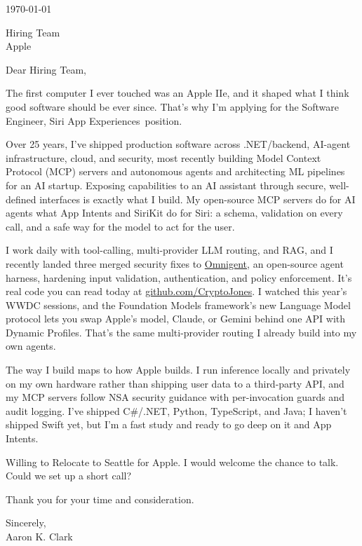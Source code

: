 \documentclass{resume}
\def\company{Apple}
\def\role{Software Engineer, Siri App Experiences}
\def\manager{Hiring Team}          %
\begin{document}
\vspace{0.5em}
\today

\bigskip
\noindent \manager \\
\company

\bigskip
\noindent Dear \manager,

The first computer I ever touched was an Apple IIe, and it shaped what I think good software should be ever since. That's why I'm applying for the \role\ position.

Over 25 years, I've shipped production software across .NET/backend, AI-agent infrastructure, cloud, and security, most recently building Model Context Protocol (MCP) servers and autonomous agents and architecting ML pipelines for an AI startup. Exposing capabilities to an AI assistant through secure, well-defined interfaces is exactly what I build. My open-source MCP servers do for AI agents what App Intents and SiriKit do for Siri: a schema, validation on every call, and a safe way for the model to act for the user.

I work daily with tool-calling, multi-provider LLM routing, and RAG, and I recently landed three merged security fixes to \href{https://github.com/omnigent-ai/omnigent}{Omnigent}, an open-source agent harness, hardening input validation, authentication, and policy enforcement. It's real code you can read today at \href{https://github.com/CryptoJones}{github.com/CryptoJones}. I watched this year's WWDC sessions, and the Foundation Models framework's new Language Model protocol lets you swap Apple's model, Claude, or Gemini behind one API with Dynamic Profiles. That's the same multi-provider routing I already build into my own agents.

The way I build maps to how Apple builds. I run inference locally and privately on my own hardware rather than shipping user data to a third-party API, and my MCP servers follow NSA security guidance with per-invocation guards and audit logging. I've shipped C\#/.NET, Python, TypeScript, and Java; I haven't shipped Swift yet, but I'm a fast study and ready to go deep on it and App Intents.

Willing to Relocate to Seattle for Apple. I would welcome the chance to talk. Could we set up a short call?

\bigskip
\noindent Thank you for your time and consideration.

\bigskip
\noindent Sincerely, \\[1em]
Aaron K. Clark
\end{document}
